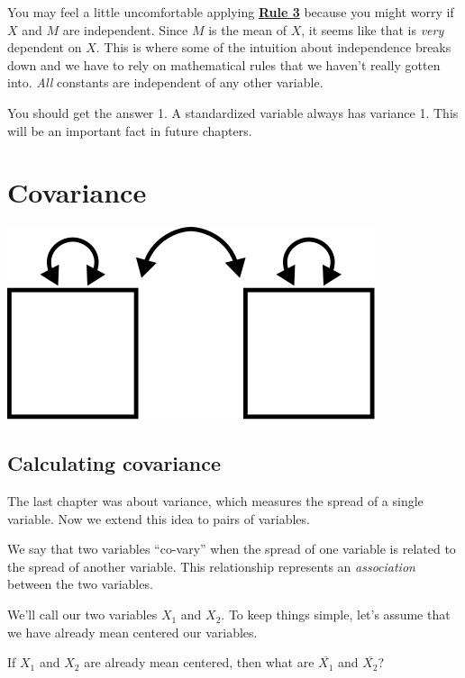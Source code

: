 \documentclass[
]{book}
\begin{document}
You may feel a little uncomfortable applying \protect\hyperlink{Rule3}{\textbf{Rule 3}} because you might worry if \(X\) and \(M\) are independent. Since \(M\) is the mean of \(X\), it seems like that is \emph{very} dependent on \(X\). This is where some of the intuition about independence breaks down and we have to rely on mathematical rules that we haven't really gotten into. \emph{All} constants are independent of any other variable.

You should get the answer 1. A standardized variable always has variance 1. This will be an important fact in future chapters.

\hypertarget{covariance}{%
\chapter{Covariance}\label{covariance}}

\begin{center}\includegraphics{graphics/covariance} \end{center}

\hypertarget{covariance-calculating}{%
\section{Calculating covariance}\label{covariance-calculating}}

The last chapter was about variance, which measures the spread of a single variable. Now we extend this idea to pairs of variables.

We say that two variables ``co-vary'' when the spread of one variable is related to the spread of another variable. This relationship represents an \emph{association} between the two variables.

We'll call our two variables \(X_{1}\) and \(X_{2}\). To keep things simple, let's assume that we have already mean centered our variables.

If \(X_{1}\) and \(X_{2}\) are already mean centered, then what are \(\overline{X_{1}}\) and \(\overline{X_{2}}\)?
\end{document}
